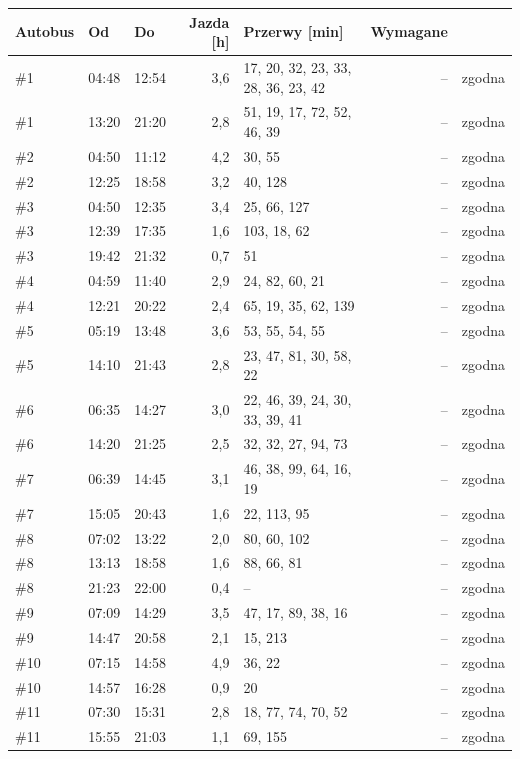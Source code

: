 \documentclass[10pt,a4paper]{article}
\begin{document}
{\footnotesize
\begin{longtable}{@{}l l l r p{5.2cm} r l@{}}\toprule
Autobus & Od & Do & Jazda [h] & Przerwy [min] & Wymagane &  \\ \midrule\endhead
\bottomrule\endfoot
\#1 & 04:48 & 12:54 & 3,6 & 17, 20, 32, 23, 33, 28, 36, 23, 42 & -- & zgodna \\
\#1 & 13:20 & 21:20 & 2,8 & 51, 19, 17, 72, 52, 46, 39 & -- & zgodna \\
\#2 & 04:50 & 11:12 & 4,2 & 30, 55 & -- & zgodna \\
\#2 & 12:25 & 18:58 & 3,2 & 40, 128 & -- & zgodna \\
\#3 & 04:50 & 12:35 & 3,4 & 25, 66, 127 & -- & zgodna \\
\#3 & 12:39 & 17:35 & 1,6 & 103, 18, 62 & -- & zgodna \\
\#3 & 19:42 & 21:32 & 0,7 & 51 & -- & zgodna \\
\#4 & 04:59 & 11:40 & 2,9 & 24, 82, 60, 21 & -- & zgodna \\
\#4 & 12:21 & 20:22 & 2,4 & 65, 19, 35, 62, 139 & -- & zgodna \\
\#5 & 05:19 & 13:48 & 3,6 & 53, 55, 54, 55 & -- & zgodna \\
\#5 & 14:10 & 21:43 & 2,8 & 23, 47, 81, 30, 58, 22 & -- & zgodna \\
\#6 & 06:35 & 14:27 & 3,0 & 22, 46, 39, 24, 30, 33, 39, 41 & -- & zgodna \\
\#6 & 14:20 & 21:25 & 2,5 & 32, 32, 27, 94, 73 & -- & zgodna \\
\#7 & 06:39 & 14:45 & 3,1 & 46, 38, 99, 64, 16, 19 & -- & zgodna \\
\#7 & 15:05 & 20:43 & 1,6 & 22, 113, 95 & -- & zgodna \\
\#8 & 07:02 & 13:22 & 2,0 & 80, 60, 102 & -- & zgodna \\
\#8 & 13:13 & 18:58 & 1,6 & 88, 66, 81 & -- & zgodna \\
\#8 & 21:23 & 22:00 & 0,4 & -- & -- & zgodna \\
\#9 & 07:09 & 14:29 & 3,5 & 47, 17, 89, 38, 16 & -- & zgodna \\
\#9 & 14:47 & 20:58 & 2,1 & 15, 213 & -- & zgodna \\
\#10 & 07:15 & 14:58 & 4,9 & 36, 22 & -- & zgodna \\
\#10 & 14:57 & 16:28 & 0,9 & 20 & -- & zgodna \\
\#11 & 07:30 & 15:31 & 2,8 & 18, 77, 74, 70, 52 & -- & zgodna \\
\#11 & 15:55 & 21:03 & 1,1 & 69, 155 & -- & zgodna \\

\end{longtable}}
\end{document}
